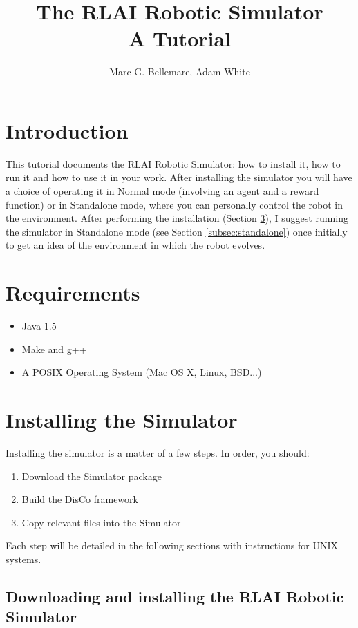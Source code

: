 \documentclass[12pt]{article}
\author{Marc G. Bellemare, Adam White}
\title{The RLAI Robotic Simulator\\ A Tutorial}
\begin{document}
\maketitle

\section{Introduction}

This tutorial documents the RLAI Robotic Simulator: how to install it, how
to run it and how to use it in your work. After installing the simulator
you will have a choice of operating it in Normal mode (involving an agent
and a reward function) or in Standalone mode, where you can personally 
control the robot in the environment. After performing the installation
(Section \ref{sec:installation}),  I suggest running the simulator in 
Standalone mode (see Section \ref{subsec:standalone}) once initially to get
an idea of the environment in which the robot evolves. 

\section{Requirements}

\begin{itemize}
\item{Java 1.5}
\item{Make and g++}
\item{A POSIX Operating System (Mac OS X, Linux, BSD...)}
\end{itemize}

\section{Installing the Simulator}\label{sec:installation}

Installing the simulator is a matter of a few steps. In order, you should:

\begin{enumerate}
\item{Download the Simulator package}
\item{Build the DisCo framework}
\item{Copy relevant files into the Simulator}
\end{enumerate}

Each step will be detailed in the following sections with instructions for
UNIX systems.

\subsection{Downloading and installing the RLAI Robotic Simulator}
\end{document}
